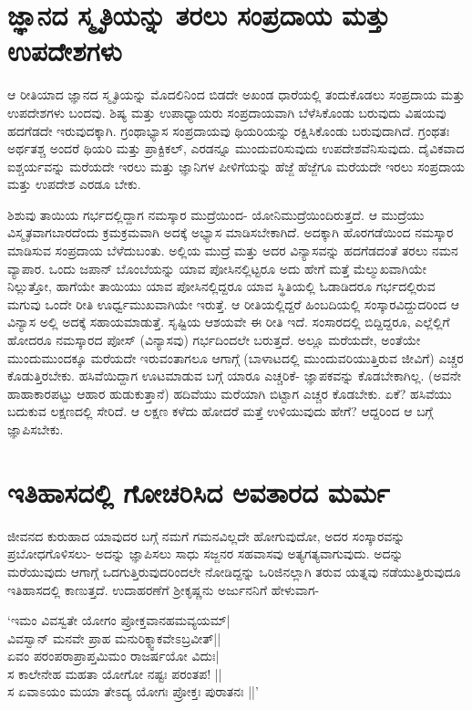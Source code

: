 \section*{ಜ್ಞಾನದ ಸ್ಮೃತಿಯನ್ನು ತರಲು ಸಂಪ್ರದಾಯ ಮತ್ತು ಉಪದೇಶಗಳು}

ಆ ರೀತಿಯಾದ ಜ್ಞಾನದ ಸ್ಮೃತಿಯನ್ನು ಮೊದಲಿನಿಂದ ಬಿಡದೇ ಅಖಂಡ ಧಾರೆಯಲ್ಲಿ ತಂದುಕೊಡಲು ಸಂಪ್ರದಾಯ ಮತ್ತು ಉಪದೇಶಗಳು ಬಂದವು. ಶಿಷ್ಯ ಮತ್ತು ಉಪಾಧ್ಯಾಯರು ಸಂಪ್ರದಾಯವಾಗಿ ಬೆಳೆಸಿಕೊಂಡು ಬರುವುದು ವಿಷಯವು ಹದಗೆಡದೇ ಇರುವುದಕ್ಕಾಗಿ. ಗ್ರಂಥಾಭ್ಯಾಸ ಸಂಪ್ರದಾಯವು ಥಿಯರಿಯನ್ನು ರಕ್ಷಿಸಿಕೊಂಡು ಬರುವುದಾಗಿದೆ. ಗ್ರಂಥತಃ ಅರ್ಥತಶ್ಚ ಅಂದರೆ ಥಿಯರಿ ಮತ್ತು ಪ್ರಾಕ್ಟಿಕಲ್, ಎರಡನ್ನೂ ಮುಂದುವರಿಸುವುದು ಉಪದೇಶವೆನಿಸುವುದು. ದೈವಿಕವಾದ ಐಶ್ಚರ್ಯವನ್ನು ಮರೆಯದೇ ಇರಲು ಮತ್ತು ಜ್ಞಾನಿಗಳ ಪೀಳಿಗೆಯನ್ನು ಹೆಜ್ಜೆ ಹೆಜ್ಜೆಗೂ ಮರೆಯದೇ ಇರಲು ಸಂಪ್ರದಾಯ ಮತ್ತು ಉಪದೇಶ ಎರಡೂ ಬೇಕು.

ಶಿಶುವು ತಾಯಿಯ ಗರ್ಭದಲ್ಲಿದ್ದಾಗ ನಮಸ್ಕಾರ ಮುದ್ರೆಯಿಂದ- ಯೋನಿಮುದ್ರೆಯಿಂದಿರುತ್ತದೆ. ಆ ಮುದ್ರೆಯು ವಿಸ್ಮೃತವಾಗಬಾರದೆಂದು ಕ್ರಮಕ್ರಮವಾಗಿ ಅದಕ್ಕೆ ಅಭ್ಯಾಸ ಮಾಡಿಸಬೇಕಾಗಿದೆ. ಅದಕ್ಕಾಗಿ ಹೊರಗಡೆಯಿಂದ ನಮಸ್ಕಾರ ಮಾಡಿಸುವ ಸಂಪ್ರದಾಯ ಬೆಳೆದುಬಂತು. ಅಲ್ಲಿಯ ಮುದ್ರೆ ಮತ್ತು ಅದರ ವಿನ್ಯಾಸವನ್ನು ಹದಗೆಡದಂತೆ ತರಲು ನಮನ ವ್ಯಾಪಾರ. ಒಂದು ಜಪಾನ್ ಬೊಂಬೆಯನ್ನು ಯಾವ ಪೋಸಿನಲ್ಲಿಟ್ಟರೂ ಅದು ಹೇಗೆ ಮತ್ತೆ ಮೆಲ್ಮುಖವಾಗಿಯೇ ನಿಲ್ಲುತ್ತೋ, ಹಾಗೆಯೇ ತಾಯಿಯು ಯಾವ ಪೋಸಿನಲ್ಲಿದ್ದರೂ ಯಾವ ಸ್ಥಿತಿಯಲ್ಲಿ ಓಡಾಡಿದರೂ ಗರ್ಭದಲ್ಲಿರುವ ಮಗುವು ಒಂದೇ ರೀತಿ ಊರ್ಧ್ವಮುಖವಾಗಿಯೇ ಇರುತ್ತೆ. ಆ ರೀತಿಯಲ್ಲಿದ್ದರೆ ಹಿಂಬದಿಯಲ್ಲಿ ಸಂಸ್ಕಾರವಿದ್ದುದರಿಂದ ಆ ವಿನ್ಯಾಸ ಅಲ್ಲಿ ಅದಕ್ಕೆ ಸಹಾಯಮಾಡುತ್ತೆ. ಸೃಷ್ಟಿಯ ಆಶಯವೇ ಈ ರೀತಿ ಇದೆ. ಸಂಸಾರದಲ್ಲಿ ಬಿದ್ದಿದ್ದರೂ, ಎಲ್ಲೆಲ್ಲಿಗೆ ಹೋದರೂ ನಮಸ್ಕಾರದ ಪೋಸ್ (ವಿನ್ಯಾಸವು) ಗರ್ಭದಿಂದಲೇ ಬರುತ್ತದೆ. ಅಲ್ಲೂ ಮರೆಯದೇ, ಅಂತೆಯೇ ಮುಂದುಮುಂದಕ್ಕೂ ಮರೆಯದೇ ಇರುವಂತಾಗಲೂ ಆಗಾಗ್ಗೆ (ಬಾಳಾಟದಲ್ಲಿ ಮುಂದುವರಿಯುತ್ತಿರುವ ಜೀವಿಗೆ) ಎಚ್ಚರ ಕೊಡುತ್ತಿರಬೇಕು. ಹಸಿವೆಯಿದ್ದಾಗ ಊಟಮಾಡುವ ಬಗ್ಗೆ ಯಾರೂ ಎಚ್ಚರಿಕೆ- ಜ್ಞಾಪಕವನ್ನು ಕೊಡಬೇಕಾಗಿಲ್ಲ. (ಅವನೇ ಹಾಹಾಕಾರಪಟ್ಟು ಆಹಾರ ಹುಡುಕುತ್ತಾನೆ) ಹದಿವೆಯು ಮರೆಯಾಗಿ ಬಿಟ್ಟಾಗ ಎಚ್ಚರ ಕೊಡಬೇಕು. ಏಕೆ? ಹಸಿವೆಯು ಬದುಕುವ ಲಕ್ಷಣದಲ್ಲಿ ಸೇರಿದೆ. ಆ ಲಕ್ಷಣ ಕಳೆದು ಹೋದರೆ ಮತ್ತೆ ಉಳಿಯುವುದು ಹೇಗೆ? ಆದ್ದರಿಂದ ಆ ಬಗ್ಗೆ ಜ್ಞಾಪಿಸಬೇಕು.

\section*{ಇತಿಹಾಸದಲ್ಲಿ ಗೋಚರಿಸಿದ ಅವತಾರದ ಮರ್ಮ}

ಜೀವನದ ಕುರುಹಾದ ಯಾವುದರ ಬಗ್ಗೆ ನಮಗೆ ಗಮನವಿಲ್ಲದೇ ಹೋಗುವುದೋ, ಅದರ ಸಂಸ್ಕಾರವನ್ನು ಪ್ರಬೋಧಗೊಳಿಸಲು- ಅದನ್ನು ಜ್ಞಾಪಿಸಲು ಸಾಧು ಸಜ್ಜನರ ಸಹವಾಸವು ಅತ್ಯಗತ್ಯವಾಗುವುದು. ಅದನ್ನು ಮರೆಯುವುದು ಆಗಾಗ್ಗೆ ಒದಗುತ್ತಿರುವುದರಿಂದಲೇ ನೋಡಿದ್ದನ್ನು ಒರಿಜಿನಲ್ಲಾಗಿ ತರುವ ಯತ್ನವು ನಡೆಯುತ್ತಿರುವುದೂ ಇತಿಹಾಸದಲ್ಲಿ ಕಾಣುತ್ತದೆ. ಉದಾಹರಣೆಗೆ ಶ್ರೀಕೃಷ್ಣನು ಅರ್ಜುನನಿಗೆ ಹೇಳುವಾಗ-

\begin{shloka}
`ಇಮಂ ವಿವಸ್ವತೇ ಯೋಗಂ ಪ್ರೋಕ್ತವಾನಹಮವ್ಯಯಮ್|\\
ವಿವಸ್ವಾನ್ ಮನವೇ ಪ್ರಾಹ ಮನುರಿಕ್ಶ್ವಾಕವೇಽಬ್ರವೀತ್||\\
ಏವಂ ಪರಂಪರಾಪ್ರಾಪ್ತಮಿಮಂ ರಾಜರ್ಷಯೋ ವಿದುಃ|\\
ಸ ಕಾಲೇನೇಹ ಮಹತಾ ಯೋಗೋ ನಷ್ಟಃ ಪರಂತಪ! ||\\
ಸ ಏವಾಽಯಂ ಮಯಾ ತೇಽದ್ಯ ಯೋಗಃ ಪ್ರೋಕ್ತಃ ಪುರಾತನಃ ||'
\end{shloka}

